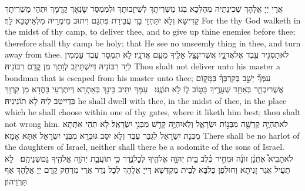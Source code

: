 {אֲרֵי יְיָ אֱלָהָךְ שְׁכִינְתֵיהּ מְהַלְּכָא בְּגוֹ מַשְׁרִיתָךְ לְשֵׁיזָבוּתָךְ וּלְמִמְסַר שָׂנְאָךְ קֳדָמָךְ וּתְהֵי מַשְׁרִיתָךְ קַדִּישָׁא וְלָא יִתַּחְזֵי בָךְ עֲבֵירַת פִּתְגָם וִיתוּב מֵימְרֵיהּ מִלְּאֵיטָבָא לָךְ׃}
{For the \lord\space thy God walketh in the midst of thy camp, to deliver thee, and to give up thine enemies before thee; therefore shall thy camp be holy; that He see no unseemly thing in thee, and turn away from thee.}{}
{לֹא\maqqaf תַסְגִּ֥יר עֶ֖בֶד אֶל\maqqaf אֲדֹנָ֑יו אֲשֶׁר\maqqaf יִנָּצֵ֥ל אֵלֶ֖יךָ מֵעִ֥ם אֲדֹנָֽיו׃}
{לָא תִמְסַר עֶבֶד עַמְמִין לְיַד רִבּוֹנֵיהּ דְּיִשְׁתֵּיזַב לְוָתָךְ מִן קֳדָם רִבּוֹנֵיהּ׃}
{Thou shalt not deliver unto his master a bondman that is escaped from his master unto thee;}{}
{עִמְּךָ֞ יֵשֵׁ֣ב בְּקִרְבְּךָ֗ בַּמָּק֧וֹם אֲשֶׁר\maqqaf יִבְחַ֛ר בְּאַחַ֥ד שְׁעָרֶ֖יךָ בַּטּ֣וֹב ל֑וֹ לֹ֖א תּוֹנֶֽנּוּ׃ \setuma }
{עִמָּךְ יִתֵּיב בֵּינָךְ בְּאַתְרָא דְּיִתְרְעֵי בַּחֲדָא מִן קִרְוָךְ בִּדְיִיטַב לֵיהּ לָא תוֹנֵינֵיהּ׃}
{he shall dwell with thee, in the midst of thee, in the place which he shall choose within one of thy gates, where it liketh him best; thou shalt not wrong him.}{}
{לֹא\maqqaf תִהְיֶ֥ה קְדֵשָׁ֖ה מִבְּנ֣וֹת יִשְׂרָאֵ֑ל וְלֹֽא\maqqaf יִהְיֶ֥ה קָדֵ֖שׁ מִבְּנֵ֥י יִשְׂרָאֵֽל׃}
{לָא תְהֵי אִתְּתָא מִבְּנָת יִשְׂרָאֵל לִגְבַר עֶבֶד וְלָא יִסַּב גּוּבְרָא מִבְּנֵי יִשְׂרָאֵל אִתָּא אָמָא׃}
{There shall be no harlot of the daughters of Israel, neither shall there be a sodomite of the sons of Israel.}{}
{לֹא\maqqaf תָבִיא֩ אֶתְנַ֨ן זוֹנָ֜ה וּמְחִ֣יר כֶּ֗לֶב בֵּ֛ית יְהֹוָ֥ה אֱלֹהֶ֖יךָ לְכׇל\maqqaf נֶ֑דֶר כִּ֧י תוֹעֲבַ֛ת יְהֹוָ֥ה אֱלֹהֶ֖יךָ גַּם\maqqaf שְׁנֵיהֶֽם׃ \setuma }
{לָא תַעֵיל אֲגַר זָנִיתָא וְחוּלְפַן כַּלְבָּא לְבֵית מַקְדְּשָׁא דַּייָ אֱלָהָךְ לְכָל נְדַר אֲרֵי מְרַחַק קֳדָם יְיָ אֱלָהָךְ אַף תַּרְוֵיהוֹן׃}
